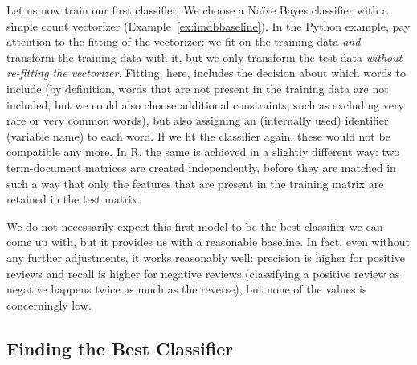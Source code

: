 Let us now train our first classifier. We choose a Na\"ive Bayes
classifier with a simple count vectorizer (Example~\ref{ex:imdbbaseline}).  In
the Python example, pay attention to the fitting of the vectorizer: we
fit on the training data \emph{and} transform the training data with
it, but we only transform the test data \emph{without re-fitting the
  vectorizer}. Fitting, here, includes the decision about which words to
include (by definition, words that are not present in the training
data are not included; but we could also choose additional
constraints, such as excluding very rare or very common words), but
also assigning an (internally used) identifier (variable name) to each
word. If we  fit the classifier again, these would not be
compatible any more. In R, the same is achieved in a slightly
different way: two term-document matrices are created independently,
before they are matched in such a way that only the features that are
present in the training matrix are retained in the test matrix.



We do not necessarily expect this first model to be the best
classifier we can come up with, but it provides us with a reasonable
baseline. In fact, even without any further adjustments, it works
reasonably well: precision is higher for positive reviews and recall
is higher for negative reviews (classifying a positive review as
negative happens twice as much as the reverse), but none of the values
is concerningly low.




\subsection{Finding the Best Classifier}



